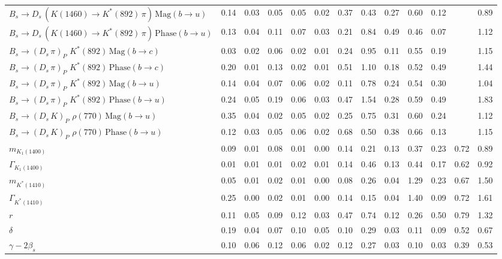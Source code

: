 \begin{tabular}{l  c  c  c  c  c  c  c  c  c  c  c  | c }
$B_s \to D_s \, ( K(1460) \to K^{*}(892) \, \pi ) \, \text{Mag} (b \to u)$ & 0.14 & 0.03 & 0.05 & 0.05 & 0.02 & 0.37 & 0.43 & 0.27 & 0.60 & 0.12 &  & 0.89 \\ 
$B_s \to D_s \, ( K(1460) \to K^{*}(892) \, \pi ) \, \text{Phase} (b \to u)$ & 0.13 & 0.04 & 0.11 & 0.07 & 0.03 & 0.21 & 0.84 & 0.49 & 0.46 & 0.07 &  & 1.12 \\ 
$B_s \to ( D_s \, \pi)_{P} \, \, K^{*}(892) \, \text{Mag} (b \to c)$ & 0.03 & 0.02 & 0.06 & 0.02 & 0.01 & 0.24 & 0.95 & 0.11 & 0.55 & 0.19 &  & 1.15 \\ 
$B_s \to ( D_s \, \pi)_{P} \, \, K^{*}(892) \, \text{Phase} (b \to c)$ & 0.20 & 0.01 & 0.13 & 0.02 & 0.01 & 0.51 & 1.10 & 0.18 & 0.52 & 0.49 &  & 1.44 \\ 
$B_s \to ( D_s \, \pi)_{P} \, \, K^{*}(892) \, \text{Mag} (b \to u)$ & 0.14 & 0.04 & 0.07 & 0.06 & 0.02 & 0.11 & 0.78 & 0.24 & 0.54 & 0.30 &  & 1.04 \\ 
$B_s \to ( D_s \, \pi)_{P} \, \, K^{*}(892) \, \text{Phase} (b \to u)$ & 0.24 & 0.05 & 0.19 & 0.06 & 0.03 & 0.47 & 1.54 & 0.28 & 0.59 & 0.49 &  & 1.83 \\ 
$B_s \to ( D_s \, K)_{P} \, \, \rho(770) \, \text{Mag} (b \to u)$ & 0.35 & 0.04 & 0.02 & 0.05 & 0.02 & 0.25 & 0.75 & 0.31 & 0.60 & 0.24 &  & 1.12 \\ 
$B_s \to ( D_s \, K)_{P} \, \, \rho(770) \, \text{Phase} (b \to u)$ & 0.12 & 0.03 & 0.05 & 0.06 & 0.02 & 0.68 & 0.50 & 0.38 & 0.66 & 0.13 &  & 1.15 \\ 
$m_{K_1(1400)} $ & 0.09 & 0.01 & 0.08 & 0.01 & 0.00 & 0.14 & 0.21 & 0.13 & 0.37 & 0.23 & 0.72 & 0.89 \\ 
$\Gamma_{K_1(1400)}$ & 0.01 & 0.01 & 0.01 & 0.02 & 0.01 & 0.14 & 0.46 & 0.13 & 0.44 & 0.17 & 0.62 & 0.92 \\ 
$m_{K^{*}(1410)}$ & 0.05 & 0.01 & 0.02 & 0.01 & 0.00 & 0.08 & 0.26 & 0.04 & 1.29 & 0.23 & 0.67 & 1.50 \\ 
$\Gamma_{K^{*}(1410)}$ & 0.25 & 0.00 & 0.02 & 0.01 & 0.00 & 0.14 & 0.15 & 0.04 & 1.40 & 0.09 & 0.72 & 1.61 \\ 
$r$ & 0.11 & 0.05 & 0.09 & 0.12 & 0.03 & 0.47 & 0.74 & 0.12 & 0.26 & 0.50 & 0.79 & 1.32 \\ 
$\delta$ & 0.19 & 0.04 & 0.07 & 0.10 & 0.05 & 0.10 & 0.29 & 0.03 & 0.11 & 0.09 & 0.52 & 0.67 \\ 
$\gamma - 2 \beta_{s}$ & 0.10 & 0.06 & 0.12 & 0.06 & 0.02 & 0.12 & 0.27 & 0.03 & 0.10 & 0.03 & 0.39 & 0.53 \\ 
\hline
\hline
\end{tabular}
